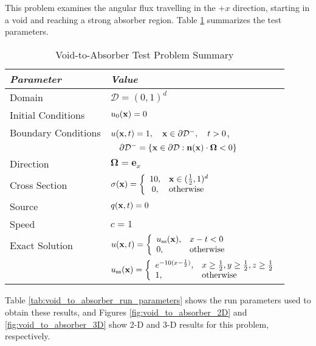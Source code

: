 This problem examines the angular flux travelling in the $+x$ direction,
starting in a void and reaching a strong absorber region.
Table \ref{tab:void_to_absorber} summarizes the test parameters.

\begin{table}[htb]\caption{Void-to-Absorber Test Problem Summary}
\label{tab:void_to_absorber}
\centering
\begin{tabular}{l l}\toprule
\emph{Parameter} & \emph{Value}\\\midrule
Domain & $\mathcal{D} = (0,1)^d$\\
Initial Conditions & $u_0(\mathbf{x})=0$\\
Boundary Conditions & $u(\mathbf{x},t)=1,\quad \mathbf{x}\in\partial\mathcal{D}^-,\quad t>0$,\\
   & $\quad\partial\mathcal{D}^-=\{\mathbf{x}\in\partial\mathcal{D}:\mathbf{n}(\mathbf{x})
       \cdot\mathbf{\Omega}<0\}$\\
Direction & $\mathbf{\Omega} = \mathbf{e}_x$\\
Cross Section & $\sigma(\mathbf{x})=\left\{\begin{array}{c l}
   10, & \mathbf{x}\in(\frac{1}{2},1)^d\\
   0,  & \mbox{otherwise}\end{array}\right.$\\
Source & $q(\mathbf{x},t)=0$\\
Speed & $c=1$\\
Exact Solution & $u(\mathbf{x},t)=\left\{\begin{array}{l l}
   u_{\text{ss}}(\mathbf{x}), & x-t<0\\
   0, & \mbox{otherwise}
   \end{array}\right.$ \\
   & $u_{\text{ss}}(\mathbf{x}) =
       \left\{\begin{array}{l l}
          e^{-10(x-\frac{1}{2})}, & x\ge\frac{1}{2}, y\ge\frac{1}{2}, z\ge\frac{1}{2}\\
          1,                      & \mbox{otherwise}
       \end{array}\right.$\\
\bottomrule\end{tabular}
\end{table}

Table \ref{tab:void_to_absorber_run_parameters} shows the run parameters used
to obtain these results, and Figures \ref{fig:void_to_absorber_2D}
and \ref{fig:void_to_absorber_3D} show 2-D and 3-D results for this
problem, respectively.

